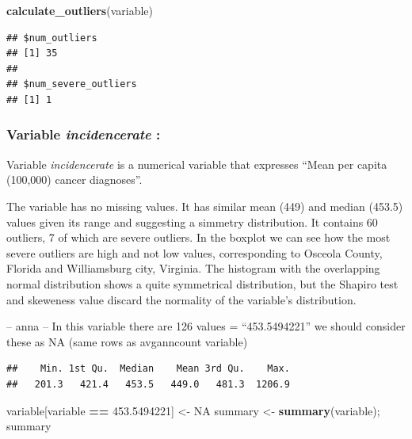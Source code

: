 \documentclass[
]{article}
\newenvironment{Shaded}{\begin{snugshade}}{\end{snugshade}}
\newcommand{\ConstantTok}[1]{\textcolor[rgb]{0.56,0.35,0.01}{#1}}
\newcommand{\FloatTok}[1]{\textcolor[rgb]{0.00,0.00,0.81}{#1}}
\newcommand{\FunctionTok}[1]{\textcolor[rgb]{0.13,0.29,0.53}{\textbf{#1}}}
\newcommand{\NormalTok}[1]{#1}
\newcommand{\OtherTok}[1]{\textcolor[rgb]{0.56,0.35,0.01}{#1}}
\newcommand{\SpecialCharTok}[1]{\textcolor[rgb]{0.81,0.36,0.00}{\textbf{#1}}}
\begin{document}
\begin{Shaded}
\begin{Highlighting}[]
\FunctionTok{calculate\_outliers}\NormalTok{(variable)}
\end{Highlighting}
\end{Shaded}

\begin{verbatim}
## $num_outliers
## [1] 35
## 
## $num_severe_outliers
## [1] 1
\end{verbatim}

\subsubsection{\texorpdfstring{Variable \emph{incidencerate}
:}{Variable incidencerate :}}\label{variable-incidencerate}

Variable \emph{incidencerate} is a numerical variable that expresses
``Mean per capita (100,000) cancer diagnoses''.

The variable has no missing values. It has similar mean (449) and median
(453.5) values given its range and suggesting a simmetry distribution.
It contains 60 outliers, 7 of which are severe outliers. In the boxplot
we can see how the most severe outliers are high and not low values,
corresponding to Osceola County, Florida and Williamsburg city,
Virginia. The histogram with the overlapping normal distribution shows a
quite symmetrical distribution, but the Shapiro test and skeweness value
discard the normality of the variable's distribution.

-- anna -- In this variable there are 126 values = ``453.5494221'' we
should consider these as NA (same rows as avganncount variable)

\begin{Shaded}
\end{Shaded}

\begin{verbatim}
##    Min. 1st Qu.  Median    Mean 3rd Qu.    Max. 
##   201.3   421.4   453.5   449.0   481.3  1206.9
\end{verbatim}

\begin{Shaded}
\begin{Highlighting}[]
\NormalTok{variable[variable }\SpecialCharTok{==} \FloatTok{453.5494221}\NormalTok{] }\OtherTok{\textless{}{-}} \ConstantTok{NA}
\NormalTok{summary }\OtherTok{\textless{}{-}} \FunctionTok{summary}\NormalTok{(variable); summary }
\end{Highlighting}
\end{Shaded}
\end{document}

